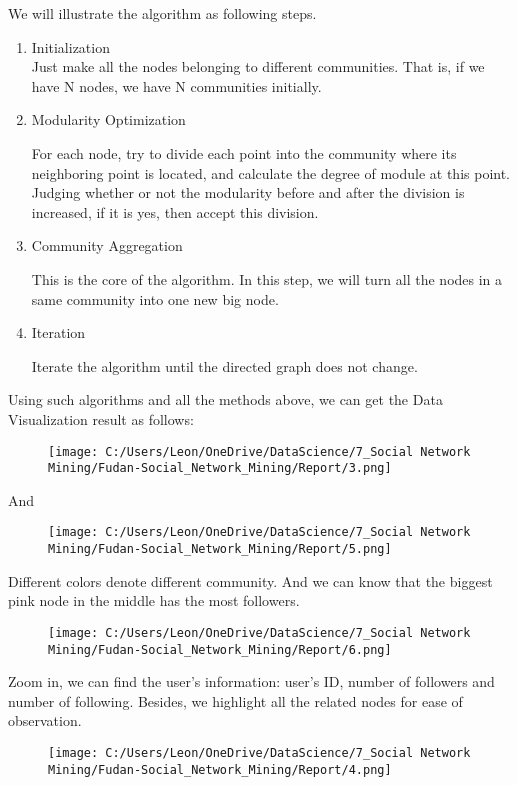 \documentclass[]{article}
\begin{document}
We will illustrate the algorithm as following steps.

\begin{enumerate}
\def\labelenumi{\arabic{enumi}.}
\item
  Initialization\\

  Just make all the nodes belonging to different communities. That is,
  if we have N nodes, we have N communities initially.
\item
  Modularity Optimization

  For each node, try to divide each point into the community where its
  neighboring point is located, and calculate the degree of module at
  this point. Judging whether or not the modularity before and after the
  division is increased, if it is yes, then accept this division.
\item
  Community Aggregation

  This is the core of the algorithm. In this step, we will turn all the
  nodes in a same community into one new big node. 
\item
  Iteration

  Iterate the algorithm until the directed graph does not change.
\end{enumerate}

Using such algorithms and all the methods above, we can get the Data
Visualization result as follows:

\begin{figure}
\centering
\texttt{[image: C:/Users/Leon/OneDrive/DataScience/7\_Social Network Mining/Fudan-Social\_Network\_Mining/Report/3.png]}
\caption{}
\end{figure}

And

\begin{figure}
\centering
\texttt{[image: C:/Users/Leon/OneDrive/DataScience/7\_Social Network Mining/Fudan-Social\_Network\_Mining/Report/5.png]}
\caption{}
\end{figure}

Different colors denote different community. And we can know that the
biggest pink node in the middle has the most followers.

\begin{figure}
\centering
\texttt{[image: C:/Users/Leon/OneDrive/DataScience/7\_Social Network Mining/Fudan-Social\_Network\_Mining/Report/6.png]}
\caption{}
\end{figure}

Zoom in, we can find the user's information: user's ID, number of
followers and number of following. Besides, we highlight all the related
nodes for ease of observation.

\begin{figure}
\centering
\texttt{[image: C:/Users/Leon/OneDrive/DataScience/7\_Social Network Mining/Fudan-Social\_Network\_Mining/Report/4.png]}
\caption{}
\end{figure}
\end{document}
